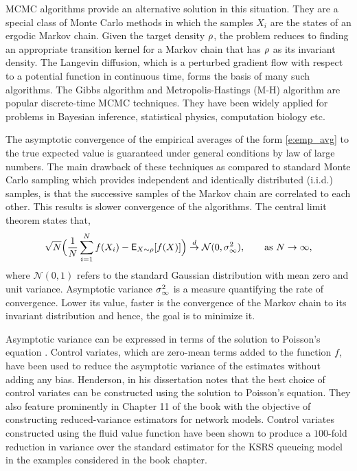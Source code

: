 MCMC algorithms provide an alternative solution in this situation. They are a special class of Monte Carlo methods in which the samples $X_i$ are the states of an ergodic Markov chain. Given the target density $\rho$, the problem reduces to finding an appropriate transition kernel for a Markov chain that has $\rho$ as its invariant density. The Langevin diffusion, which is a perturbed gradient flow with respect to a potential function in continuous time, forms the basis of many such algorithms. The Gibbs algorithm \cite{tanwon87} and Metropolis-Hastings (M-H)  algorithm \cite{has70} are popular discrete-time MCMC techniques. They have been widely applied for problems in Bayesian inference, statistical physics, computation biology etc.

The asymptotic convergence of the empirical averages of the form \eqref{e:emp_avg} to the true expected value is guaranteed under general conditions by law of large numbers. The main drawback of these techniques as compared to standard Monte Carlo sampling which provides independent and identically distributed (i.i.d.) samples, is that the successive samples of the Markov chain are correlated to each other. This results is slower convergence of the algorithms. The central limit theorem states that,
\begin{equation}
\sqrt{N} \Bigl(\frac{1}{N} \sum_{i=1}^N f(X_i) - {\sf E}_{X \sim \rho} [f(X)] \Bigr) \overset{d}{\to} \mathcal{N}(0, \sigma_\infty^2),\qquad \text{as } N \to \infty, 
\end{equation}
where $\mathcal{N}(0,1)$ refers to the standard Gaussian distribution with mean zero and unit variance. Asymptotic variance $\sigma_\infty^2$ is a measure quantifying the rate of convergence. Lower its value, faster is the convergence of the Markov chain to its invariant distribution and hence, the goal is to minimize it. 

Asymptotic variance can be expressed in terms of the solution to Poisson's equation \cite{ctcn}. Control variates, which are zero-mean terms added to the function $f$, have been used to reduce the asymptotic variance of the estimates without adding any bias. Henderson, in his dissertation \cite{henthesis97} notes that the best choice of control variates can be constructed using the solution to Poisson's equation. They also feature prominently in Chapter 11 of the book \cite{ctcn} with the objective of constructing reduced-variance estimators for network models. Control variates constructed using the fluid value function have been shown to produce a $100$-fold reduction in variance over the standard estimator for the KSRS queueing model in the examples considered in the book chapter. 

